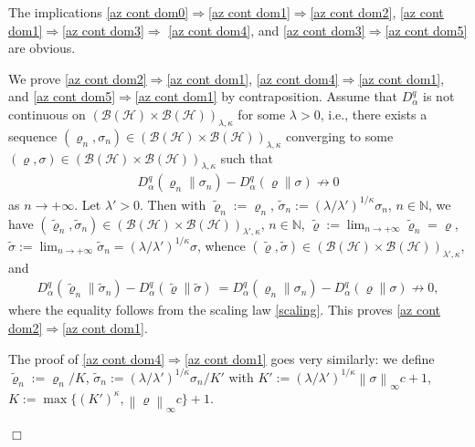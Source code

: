 \documentclass[unsortedaddress,superscriptaddress,pra,notitlepage]{revtex4}
\newenvironment{proof}[1][Proof]{\begin{trivlist}
\item[\hskip \labelsep {\bfseries #1}]}{\hfill$\Box$\end{trivlist}}
\def\B{{\mathcal B}}
\def\bN{\mathbb{N}}
\def\rho{\varrho}
\def\hil{{\mathcal H}}
\def\imp{\Longrightarrow}
\def\pwr{\kappa}
\newcommand{\norm}[1]{\left\| #1\right\|}
\begin{document}
\begin{proof}
The implications 
\ref{az cont dom0}$\imp$\ref{az cont dom1}$\imp$\ref{az cont dom2},
\ref{az cont dom1}$\imp$\ref{az cont dom3}$\imp$ \ref{az cont dom4}, 
and \ref{az cont dom3}$\imp$\ref{az cont dom5}
are obvious.

We prove \ref{az cont dom2}$\imp$\ref{az cont dom1}, 
\ref{az cont dom4}$\imp$\ref{az cont dom1},
and
\ref{az cont dom5}$\imp$\ref{az cont dom1}
by contraposition. Assume that 
$D_{\alpha}^q$ is not continuous on $(\B(\hil)\times\B(\hil))_{\lambda,\pwr}$ for some $\lambda>0$, i.e., there exists a sequence 
$(\rho_n,\sigma_n)\in (\B(\hil)\times\B(\hil))_{\lambda,\pwr}$ converging to 
some $(\rho,\sigma)\in (\B(\hil)\times\B(\hil))_{\lambda,\pwr}$ such that 
\begin{align*}
D_{\alpha}^q(\rho_n\|\sigma_n)-D_{\alpha}^q(\rho\|\sigma)
\not\to 0
\end{align*}
as $n\to+\infty$. Let $\lambda'>0$.
Then with $\tilde\rho_n:=\rho_n$, $\tilde\sigma_n:=(\lambda/\lambda')^{1/\pwr}\sigma_n$, $n\in\bN$, we have
$(\tilde\rho_n,\tilde\sigma_n)\in(\B(\hil)\times\B(\hil))_{\lambda',\pwr}$, $n\in\bN$, 
$\tilde\rho:=\lim_{n\to+\infty}\tilde\rho_n=\rho$,
$\tilde\sigma:=\lim_{n\to+\infty}\tilde\sigma_n=(\lambda/\lambda')^{1/\pwr}\sigma$,
whence $(\tilde\rho,\tilde\sigma)\in(\B(\hil)\times\B(\hil))_{\lambda',\pwr}$,
and 
\begin{align*}
D_{\alpha}^q(\tilde\rho_n\|\tilde\sigma_n)-
D_{\alpha}^q(\tilde\rho\|\tilde\sigma)\
=
D_{\alpha}^q(\rho_n\|\sigma_n)-D_{\alpha}^q(\rho\|\sigma)
\not\to 0,
\end{align*}
where the equality follows from the scaling law \eqref{scaling}.
This proves \ref{az cont dom2}$\imp$\ref{az cont dom1}.

The proof of \ref{az cont dom4}$\imp$\ref{az cont dom1} goes very similarly:
we define
$\tilde\rho_n:=\rho_n/K$, $\tilde\sigma_n:=(\lambda/\lambda')^{1/\pwr}\sigma_n/K'$ with 
$K' :=(\lambda/\lambda')^{1/\pwr}\norm{\sigma}_{\infty}c+1$, 
$K:=\max\{(K')^{\pwr},\norm{\rho}_{\infty}c\}+1$.


\end{proof}
\end{document}
